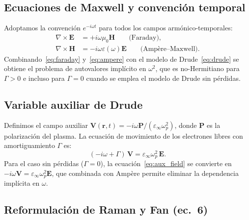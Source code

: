 \documentclass[12pt,a4paper]{article}
\newcommand{\omegap}{\omega_p}
\newcommand{\epsinf}{\varepsilon_\infty}
\newcommand{\vect}[1]{\bm{#1}}
\begin{document}
\subsection{Ecuaciones de Maxwell y convención temporal}

Adoptamos la convención $e^{-i\omega t}$ para todos los campos
armónico-temporales:
\begin{align}
  \nabla \times \vect{E} &= +i\omega\mu_0\vect{H}
    \qquad \text{(Faraday)}, \label{eq:faraday}\\
  \nabla \times \vect{H} &= -i\omega\varepsilon(\omega)\vect{E}
    \qquad \text{(Ampère--Maxwell)}. \label{eq:ampere}
\end{align}
Combinando~\eqref{eq:faraday} y~\eqref{eq:ampere} con el modelo de
Drude~\eqref{eq:drude} se obtiene el problema de autovalores implícito en
$\omega^2$, que es no-Hermitiano para $\Gamma>0$ e incluso para
$\Gamma=0$ cuando se emplea el modelo de Drude sin pérdidas.

\subsection{Variable auxiliar de Drude}

Definimos el campo auxiliar $\vect{V}(\vect{r},t) = -i\omega\vect{P}/(\epsinf\omegap^2)$,
donde $\vect{P}$ es la polarización del plasma.
La ecuación de movimiento de los electrones libres con amortiguamiento $\Gamma$ es:
\begin{equation}
  (-i\omega + \Gamma)\,\vect{V} = \epsinf\omegap^2\,\vect{E}.
  \label{eq:aux_field}
\end{equation}
Para el caso sin pérdidas ($\Gamma=0$), la ecuación~\eqref{eq:aux_field}
se convierte en $-i\omega\vect{V} = \epsinf\omegap^2\vect{E}$,
que combinada con Ampère permite eliminar la dependencia implícita en $\omega$.

\subsection{Reformulación de Raman y Fan (ec.\ 6)}

\label{sec:raman_fan}
\end{document}
